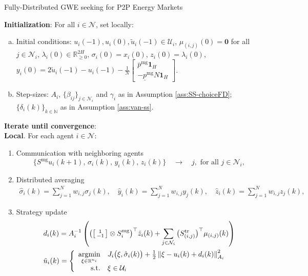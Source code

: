 \documentclass[10pt]{article}
\newcommand{\mc}{\mathcal}
\newcommand{\bb}{\mathbb}
\newcommand{\R}{\bb R}
\newcommand{\argmin}{\operatorname{argmin}}
\newcommand{\0}{\mathbf{0}}
\newcommand{\1}{\mathbf{1}}
\begin{document}
\begin{algorithm}[H]

	\caption{Fully-Distributed GWE seeking for P2P Energy Markets}
	
	\medskip
	\noindent
	\textbf{Initialization}:
	For all $ i \in \mc N$, set locally:
	\begin{enumerate}[(a)]
		\item Initial conditions: $u_i(-1), u_i(0), \tilde u_i(-1) \in \mc U_i$, $\mu_{(i,j)}(0) = \0$ for all $ j \in \mc N_i$, $\lambda_i(0) \in \R^{2H}_{\geq 0}$, $\sigma_i(0)=x_i(0)$, $z_i(0) = \lambda_i(0)$, $y_i(0) = 2\tilde u_i(-1)- u_i(-1) -  \frac{1}{N} \left[
	\begin{smallmatrix}
	\overline{p}^{\mathrm{mg}}\1_{H} \\
	-     \underline{p}^{\mathrm{mg}}N \1_{H}
	\end{smallmatrix} 
	\right]  		
		$.
		
		\item Step-sizes:
$A_i$, $\{\beta_{ij}\}_{j \in \mc N_i}$ and $\gamma_i$ as in Assumption \ref{ass:SS-choiceFD}; $\{ \delta_i(k)\}_{k \in \bb N}$ as in Assumption \ref{ass:van-ss}.

	\end{enumerate}
	
	
	\medskip
	\noindent
	\textbf{Iterate until convergence}:\\[.5em]
\textbf{Local}. For each agent $i \in \mc N$:

\begin{enumerate}[(1)]
\item Communication with neighboring agents
$$ \big\{ S^{\textrm{mg}}  u_{i}(k+1), \, \sigma_i(k), \, y_i(k), \, z_i(k) \big\} \quad \longrightarrow \quad j, \text{ for all } j \in \mc N_i,$$

\item Distributed averaging
\begin{align*} \textstyle
  \hat{\sigma}_i(k) = \sum_{j =1}^N w_{i,j} \sigma_j(k),
  \quad
   \hat y_i(k) = \sum_{j =1}^N w_{i,j}  y_j(k), 
   \quad
  \hat z_i(k) = \sum_{j =1}^N w_{i,j}  z_j(k),
\end{align*}

\item Strategy update
	\begin{align*} 
	\textstyle
&	d_i(k) = 
	A_i^{-1} \left(
	{ \left( \left[
	\begin{smallmatrix}
	1 \\
	- 1
	\end{smallmatrix}
	\right] \otimes S^{\textrm{mg}}_i \right)}^\top
	\hat z_i(k)
	+
	\sum_{j \in \mc N_i}  {\big(S^{\textrm{tr}}_{(i,j)}\big)}^\top {\mu_{(i,j)}(k)} 
	\right) \\
	\textstyle
&	
\tilde u_i(k) = 
\left\{
\begin{array}{r l}
	\underset{\xi \in \R^{n_i}}{\argmin} &
	J_{i} \big( \xi , \hat \sigma_i(k) \big) 
	+ \frac{1}{2}
	\left\| \xi - u_i(k) + d_i(k) 
	\textstyle
	  \right\|^2_{A_i} \\
	  \text{s.t.} & \xi \in \mc U_i
\end{array}
\right.
	\end{align*}


\end{enumerate}
\end{algorithm}
\end{document}
